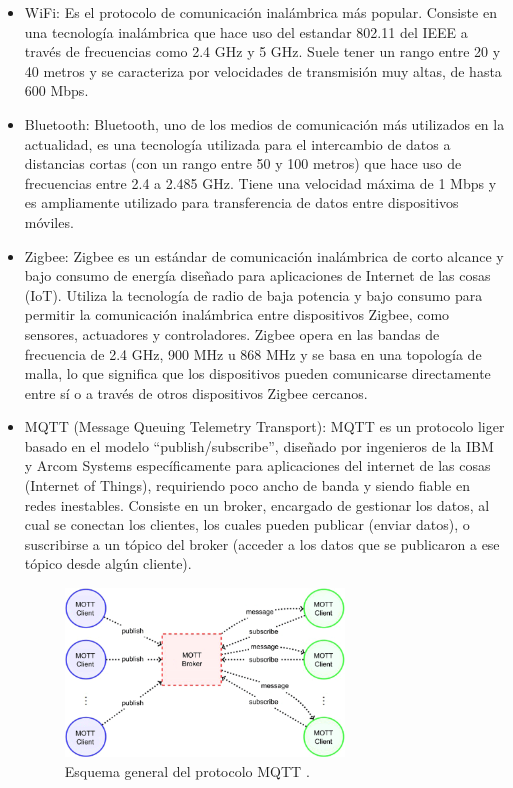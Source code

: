 \begin{itemize}
    \item WiFi: Es el protocolo de comunicación inalámbrica más popular. Consiste en una tecnología inalámbrica que hace uso del estandar 802.11 del IEEE a través de frecuencias como 2.4 GHz y 5 GHz. Suele tener un rango entre 20 y 40 metros y se caracteriza por velocidades de transmisión muy altas, de hasta 600 Mbps.
    
    \item Bluetooth: Bluetooth, uno de los medios de comunicación más utilizados en la actualidad, es una tecnología utilizada para el intercambio de datos a distancias cortas (con un rango entre 50 y 100 metros) que hace uso de frecuencias entre 2.4 a 2.485 GHz. Tiene una velocidad máxima de 1 Mbps y es ampliamente utilizado para transferencia de datos entre dispositivos móviles.
    
    \item Zigbee: Zigbee es un estándar de comunicación inalámbrica de corto alcance y bajo consumo de energía diseñado para aplicaciones de Internet de las cosas (IoT). Utiliza la tecnología de radio de baja potencia y bajo consumo para permitir la comunicación inalámbrica entre dispositivos Zigbee, como sensores, actuadores y controladores. Zigbee opera en las bandas de frecuencia de 2.4 GHz, 900 MHz u 868 MHz y se basa en una topología de malla, lo que significa que los dispositivos pueden comunicarse directamente entre sí o a través de otros dispositivos Zigbee cercanos. 
    
    \item MQTT (Message Queuing Telemetry Transport): MQTT es un protocolo liger basado en el modelo ``publish/subscribe'', diseñado por ingenieros de la IBM y Arcom Systems específicamente para aplicaciones del internet de las cosas (Internet of Things), requiriendo poco ancho de banda y siendo fiable en redes inestables. Consiste en un broker, encargado de gestionar los datos, al cual se conectan los clientes, los cuales pueden publicar (enviar datos), o suscribirse a un tópico del broker (acceder a los datos que se publicaron a ese tópico desde algún cliente).
    
    \begin{figure}[H]
        \centering
        \includegraphics[width = 0.7\textwidth]{imagenes/cap1_marcoteo/MQTT-protocol-model.png}
        \caption{Esquema general del protocolo MQTT \citep{aloufi2020hybrid}.}
        \label{fig:mqtt}
    \end{figure}
    
\end{itemize}

